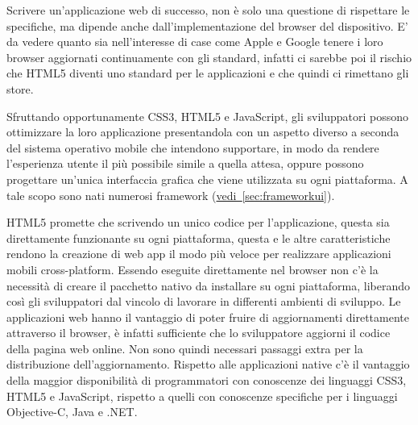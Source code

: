 		Scrivere un'applicazione web di successo, non è solo una questione di
		rispettare le specifiche, ma dipende anche dall'implementazione del 
		browser del dispositivo. E' da vedere quanto sia nell'interesse di case 
		come Apple e Google tenere i loro browser aggiornati continuamente con 
		gli standard, infatti ci sarebbe poi il rischio che HTML5 diventi uno 
		standard per le applicazioni e che quindi ci rimettano gli 
		store\citep{White:Native-vs-Html}. 

		Sfruttando opportunamente CSS3, HTML5 e JavaScript, gli sviluppatori 
		possono ottimizzare la loro applicazione presentandola con un aspetto 
		diverso a seconda del sistema operativo mobile che intendono supportare, 
		in modo da rendere l'esperienza utente il più possibile simile a quella 
		attesa, oppure possono progettare un'unica interfaccia grafica che viene 
		utilizzata su ogni piattaforma. A tale scopo sono nati numerosi 
		framework (\hyperref[sec:frameworkui]{vedi~\ref{sec:frameworkui}}).

		HTML5 promette che scrivendo un unico codice per l'applicazione, 
		questa sia direttamente funzionante su ogni piattaforma, questa e le 
		altre caratteristiche rendono la creazione di web app il modo più veloce 
		per realizzare applicazioni mobili  cross-platform. Essendo eseguite 
		direttamente nel browser non c'è la necessità di creare il pacchetto 
		nativo da installare su ogni piattaforma, liberando così gli 
		sviluppatori dal vincolo di lavorare in differenti ambienti di sviluppo. 
		Le applicazioni web hanno il vantaggio di poter fruire di aggiornamenti 
		direttamente attraverso il browser, è infatti sufficiente che lo 
		sviluppatore aggiorni il codice della pagina web online. Non sono quindi
		necessari passaggi extra per la distribuzione dell'aggiornamento. 
		Rispetto alle applicazioni native c'è il vantaggio della maggior 
		disponibilità di programmatori con conoscenze dei linguaggi CSS3, HTML5 
		e JavaScript, rispetto a quelli con conoscenze specifiche per i 
		linguaggi Objective-C, Java e .NET.

